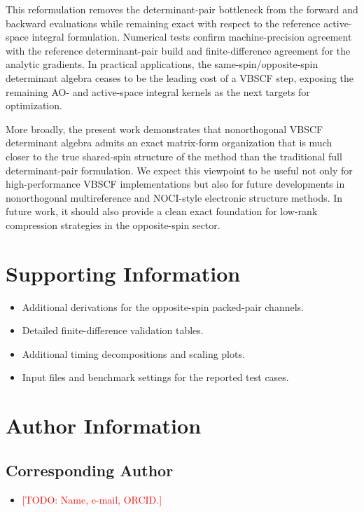 \documentclass[journal=jctcce,manuscript=article]{achemso}
\newcommand{\todo}[1]{\textcolor{red}{[TODO: #1]}}
\begin{document}
This reformulation removes the determinant-pair bottleneck from the forward and
backward evaluations while remaining exact with respect to the reference
active-space integral formulation. Numerical tests confirm machine-precision
agreement with the reference determinant-pair build and finite-difference
agreement for the analytic gradients. In practical applications, the
same-spin/opposite-spin determinant algebra ceases to be the leading cost of a
VBSCF step, exposing the remaining AO- and active-space integral kernels as the
next targets for optimization.

More broadly, the present work demonstrates that nonorthogonal VBSCF
determinant algebra admits an exact matrix-form organization that is much
closer to the true shared-spin structure of the method than the traditional full
determinant-pair formulation. We expect this viewpoint to be useful not only
for high-performance VBSCF implementations but also for future developments in
nonorthogonal multireference and NOCI-style electronic structure methods. In
future work, it should also provide a clean exact foundation for low-rank
compression strategies in the opposite-spin sector.

\section*{Supporting Information}
\begin{itemize}
  \item Additional derivations for the opposite-spin packed-pair channels.
  \item Detailed finite-difference validation tables.
  \item Additional timing decompositions and scaling plots.
  \item Input files and benchmark settings for the reported test cases.
\end{itemize}

\section*{Author Information}
\subsection*{Corresponding Author}
\begin{itemize}
  \item \todo{Name, e-mail, ORCID.}
\end{itemize}
\end{document}
